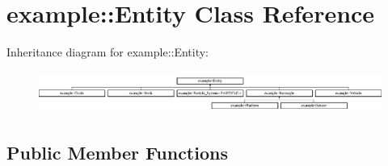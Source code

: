 \hypertarget{classexample_1_1_entity}{}\section{example\+::Entity Class Reference}
\label{classexample_1_1_entity}
Inheritance diagram for example\+::Entity\+:\begin{figure}[H]
\begin{center}
\leavevmode
\includegraphics[height=1.371429cm]{classexample_1_1_entity}
\end{center}
\end{figure}
\subsection*{Public Member Functions}
